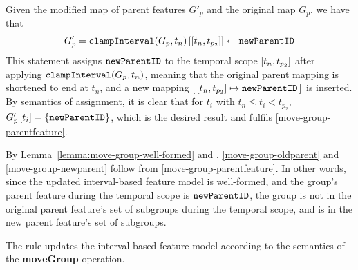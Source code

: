 Given the modified map of parent features $G'_p$ and the original map $G_p$, we have that
\[
   G'_p = \lookup{\var{clampInterval}(G_p, t_n)}{\interval{t_n}{t_{p_2}}} \assign \var{newParentID}
\]
This statement assigns $\texttt{newParentID}$ to the temporal scope $\interval{t_n}{t_{p_2}}$ after applying $\texttt{clampInterval}(G_p, t_n)$, meaning that the original parent mapping is shortened to end at $t_n$, and a new mapping $\intervalmapping{t_n}{t_{p_2}}{\var{newParentID}}$ is inserted. By semantics of assignment, it is clear that for $t_i$ with $t_n \leq t_i < t_{p_2}$, $G'_p \left[ t_i \right] = \left\{\texttt{newParentID}\right\}$, which is the desired result and fulfils \ref{move-group-parentfeature}.

By Lemma~\vref{lemma:move-group-well-formed} and , \ref{move-group-oldparent} and \ref{move-group-newparent} follow from \ref{move-group-parentfeature}. In other words, since the updated interval-based feature model is well-formed, and the group's parent feature during the temporal scope is $\texttt{newParentID}$, the group is not in the original parent feature's set of subgroups during the temporal scope, and is in the new parent feature's set of subgroups.
\\

\begin{lemma}
   The  rule updates the interval-based feature model according to the semantics of the \textbf{moveGroup} operation.
   \label{lemma:move-group-mod}
\end{lemma}
